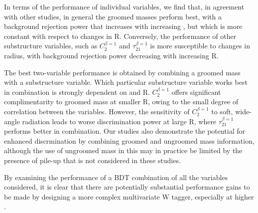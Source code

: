 In terms of the performance of individual variables, we find that, in
agreement with other studies, in
general the groomed masses perform best, with a background rejection
power that increases with increasing \pt, but which is more constant
with respect to changes in R. Conversely, the performance of other
substructure variables, such as $C_2^{\beta=1}$ and
$\tau_{21}^{\beta=1}$ is more susceptible to changes in radius, with
background rejection power decreasing with increasing R.

The best two-variable performance is obtained by combining a groomed
mass with a substructure variable. Which particular substructure
variable works best in combination is strongly dependent on \pt and
R. $C_2^{\beta=1}$ offers significant complimentarity to groomed mass
at smaller R, owing to the small degree of correlation between the
variables. However, the sensitivity of $C_2^{\beta=1}$ to soft,
wide-angle radiation leads to worse discrimination power at large R,
where $\tau_{21}^{\beta=1}$ performs better in combination. Our
studies also demonstrate the potential for enhanced discrmination by
combining groomed and ungroomed mass information, although the use of
ungroomed mass in this may in practice be limited by the presence of
pile-up that is not considered in these studies.

By examining the performance of a BDT combination of all the variables
considered, it is clear that there are potentially substantial performance gains to be made by designing a more
complex multivariate W tagger, especially at higher \pt.




